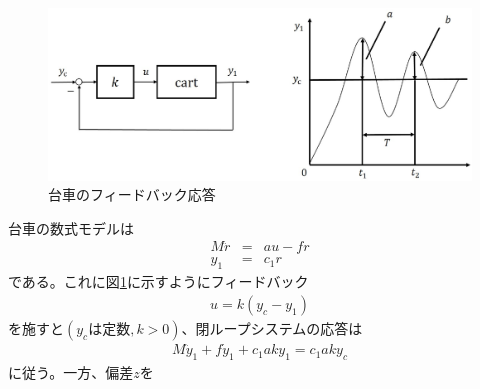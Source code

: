 \documentclass[a4j,11pt,twoside]{ujbook}
\begin{document}
	\begin{figure}[htbp]
		\begin{center}
			\includegraphics[width=1.0\linewidth]{feedback.eps}
			\caption{台車のフィードバック応答}
			\label{fig:台車のフィードバック応答}
		\end{center}
	\end{figure}

	台車の数式モデルは
	\begin{eqnarray*}
		M\ddot{r} & = & au - fr \\
		y_1 & = & c_1r
	\end{eqnarray*}
	である。これに図\ref{fig:台車のフィードバック応答}に示すようにフィードバック
	\begin{eqnarray*}
		u = k(y_c - y_1)
	\end{eqnarray*}
	を施すと$(y_cは定数,k>0)$、閉ループシステムの応答は
	\begin{eqnarray*}
		M\ddot{y}_1 + f\dot{y}_1 + c_1aky_1 = c_1aky_c
	\end{eqnarray*}
	に従う。一方、偏差$z$を
	
\end{document}

